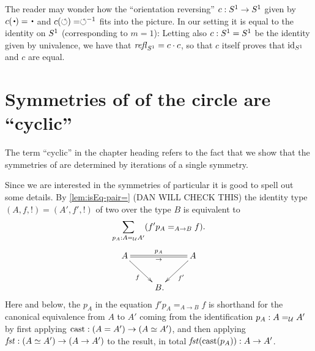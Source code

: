
\begin{remark}
  \label{rem:flipthecircle}
  The reader may wonder how the ``orientation reversing'' $c:{S^1}\to {S^1}$ given by $c(\base)=\base$ and $c(\circlearrowleft)=\circlearrowleft^{-1}$ fits into the picture.  In our setting it is equal to the identity on ${S^1}$ (corresponding to $m=1$): Letting also $c:{S^1}={S^1}$ be the identity given by univalence, we have that $\mathop{{\it refl}_{{S^1}}}=c\cdot c$, so that $c$ itself proves that $\mathord{\mathrm{id}}_{{S^1}}$ and $c$ are equal.
\end{remark}

\section{Symmetries of \coverings of the circle are ``cyclic'' }
\label{sec:deckS1}

The term ``cyclic'' in the chapter heading refers to the fact that we show that the symmetries of \coverings are determined by iterations of a single symmetry.  



\begin{remark}
Since we are interested in the symmetries of particular \coverings it is good to spell out some details.
By \cref{lem:isEq-pair=} (DAN WILL CHECK THIS) the identity type  
$(A,f,!)=(A',f',!)$ of two \coverings over the type $B$ is equivalent to 
\[
\sum_{p_A:A=_{\mathcal{U}}A'}(f'p_A=_{A\to B}f). 
\]
$$\xymatrix{A\ar@{=}[rr]^{p_A}_\to\ar[dr]_f&&A\ar[dl]^{f'}\\&\,B.&}$$
Here and below, the $p_A$ in the equation $f'p_A=_{A\to B}f$ is 
shorthand for the canonical equivalence from $A$ to $A'$ 
coming from the identification $p_A:A=_{\mathcal{U}}A'$ by first
applying $\mathrm{cast}:(A=A')\to (A\simeq A')$, and then
applying $\mathop{\mathit{fst}}:(A\simeq A')\to(A\to A')$ to the result,
in total $\mathop{\mathit{fst}}(\mathrm{cast}(p_A)): A\to A'$.
\end{remark}

